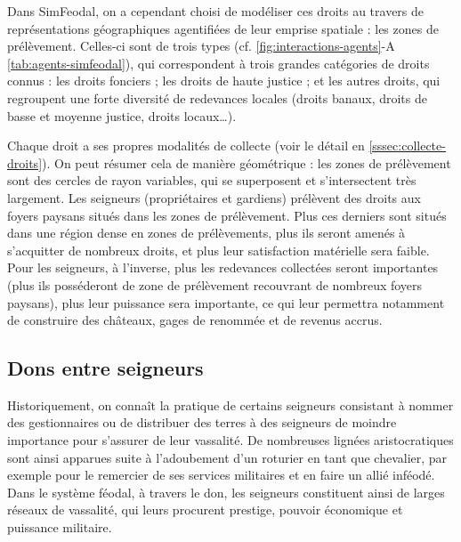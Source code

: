 \begin{tcolorbox}[breakable,left=0pt,right=0pt,top=0pt,bottom=0pt,
	colback=gray!15,colframe=gray!15,width=\dimexpr\textwidth\relax, 
	enlarge left by=0mm, boxsep=5pt,arc=0pt,outer arc=0pt]
Dans SimFeodal, on a cependant choisi de modéliser ces droits au travers de représentations géographiques agentifiées de leur emprise spatiale : les zones de prélèvement.
Celles-ci sont de trois types (cf. \cref{fig:interactions-agents}-A \cref{tab:agents-simfeodal}), qui correspondent à trois grandes catégories de droits connus : les droits fonciers ; les droits de haute justice ; et les autres droits, qui regroupent une forte diversité de redevances locales (droits banaux, droits de basse et moyenne justice, droits locaux\ldots).

Chaque droit a ses propres modalités de collecte (voir le détail en \cref{sssec:collecte-droits}).
On peut résumer cela de manière géométrique : les zones de prélèvement sont des cercles de rayon variables, qui se superposent et s'intersectent très largement.
Les seigneurs (propriétaires et gardiens) prélèvent des droits aux foyers paysans situés dans les zones de prélèvement.
Plus ces derniers sont situés dans une région dense en zones de prélèvements, plus ils seront amenés à s'acquitter de nombreux droits, et plus leur satisfaction matérielle sera faible.
Pour les seigneurs, à l'inverse, plus les redevances collectées seront importantes (plus ils posséderont de zone de prélèvement recouvrant de nombreux foyers paysans), plus leur puissance sera importante, ce qui leur permettra notamment de construire des châteaux, gages de renommée et de revenus accrus.
\end{tcolorbox}

\subsection{Dons entre seigneurs \label{meca-dons}}


Historiquement, on connaît la pratique de certains seigneurs consistant à nommer des gestionnaires ou de distribuer des terres à des seigneurs de moindre importance pour s'assurer de leur vassalité.
De nombreuses lignées aristocratiques sont ainsi apparues suite à l'adoubement d'un roturier en tant que chevalier, par exemple pour le remercier de ses services militaires et en faire un allié inféodé.
Dans le système féodal, à travers le don, les seigneurs constituent ainsi de larges réseaux de vassalité, qui leurs procurent prestige, pouvoir économique et puissance militaire.


